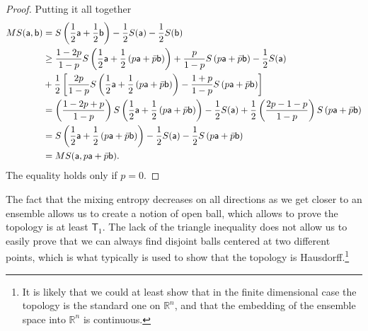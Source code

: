 \begin{mathSection}
\begin{proof}
	Putting it all together
	\begin{equation}
		\begin{aligned}
			MS(\ens[a],\ens[b]) &= S\left(\frac{1}{2} \ens[a] + \frac{1}{2} \ens[b]\right)- \frac{1}{2} S(\ens[a]) - \frac{1}{2} S(\ens[b]) \\
			&\geq \frac{1-2p}{1-p}S\left(\frac{1}{2} \ens[a] + \frac{1}{2}\left(p\ens[a] + \bar{p} \ens[b]\right)\right) + \frac{p}{1-p} S\left(p\ens[a] + \bar{p} \ens[b]\right) - \frac{1}{2} S(\ens[a]) \\
			&+ \frac{1}{2}\left[\frac{2p}{1-p} S\left(\frac{1}{2} \ens[a] + \frac{1}{2}\left(p\ens[a] + \bar{p} \ens[b]\right)\right) - \frac{1+p}{1-p} S\left(p \ens[a] + \bar{p} \ens[b] \right)\right] \\
			&= \left(\frac{1-2p + p}{1-p}\right)S\left(\frac{1}{2} \ens[a] + \frac{1}{2}\left(p\ens[a] + \bar{p} \ens[b]\right)\right) - \frac{1}{2} S(\ens[a]) + \frac{1}{2}\left(\frac{2p-1-p}{1-p}\right) S\left(p\ens[a] + \bar{p} \ens[b]\right) \\
			&= S\left(\frac{1}{2} \ens[a] + \frac{1}{2}\left(p\ens[a] + \bar{p} \ens[b]\right)\right) - \frac{1}{2} S(\ens[a]) - \frac{1}{2} S\left(p\ens[a] + \bar{p} \ens[b]\right) \\
			&= MS(\ens[a], p\ens[a] + \bar{p} \ens[b]).
		\end{aligned}
	\end{equation}
	The equality holds only if $p=0$.
\end{proof}
\end{mathSection}

The fact that the mixing entropy decreases on all directions as we get closer to an ensemble allows us to create a notion of open ball, which allows to prove the topology is at least $\mathsf{T}_1$. The lack of the triangle inequality does not allow us to easily prove that we can always find disjoint balls centered at two different points, which is what typically is used to show that the topology is Hausdorff.\footnote{It is likely that we could at least show that in the finite dimensional case the topology is the standard one on $\mathbb{R}^n$, and that the embedding of the ensemble space into $\mathbb{R}^n$ is continuous.}

